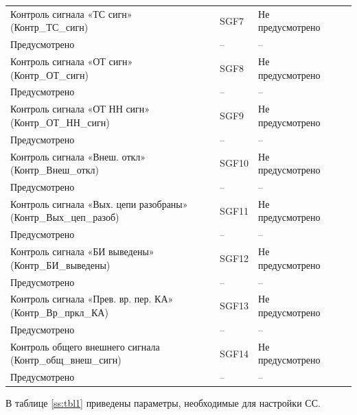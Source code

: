 \begin{longtable}{|>{\centering\arraybackslash}m{5.3cm}|>{\centering\arraybackslash}m{3.3cm}|>{\centering\arraybackslash}m{4.2cm}|>{\centering\arraybackslash}m{1.8cm}|>{\centering\arraybackslash}m{1cm}|}
\hline
\centering Контроль сигнала «ТС сигн» (Контр\_ТС\_сигн)  & \centering SGF7 & \centering Не предусмотрено \\ Предусмотрено & \centering -- & \centering \arraybackslash -- \\
\hline
\centering Контроль сигнала «ОТ сигн» (Контр\_ОТ\_сигн)  & \centering SGF8 & \centering Не предусмотрено \\ Предусмотрено & \centering -- & \centering \arraybackslash -- \\
\hline
\centering Контроль сигнала «ОТ НН сигн» (Контр\_ОТ\_НН\_сигн)  & \centering SGF9 & \centering Не предусмотрено \\ Предусмотрено & \centering -- & \centering \arraybackslash -- \\
\hline
\centering Контроль сигнала «Внеш. откл» (Контр\_Внеш\_откл)  & \centering SGF10 & \centering Не предусмотрено \\ Предусмотрено & \centering -- & \centering \arraybackslash -- \\
\hline
\centering Контроль сигнала «Вых. цепи разобраны» (Контр\_Вых\_цеп\_разоб)  & \centering SGF11 & \centering Не предусмотрено \\ Предусмотрено & \centering -- & \centering \arraybackslash -- \\
\hline
\centering Контроль сигнала «БИ выведены» (Контр\_БИ\_выведены)  & \centering SGF12 & \centering Не предусмотрено \\ Предусмотрено & \centering -- & \centering \arraybackslash -- \\
\hline
\centering Контроль сигнала «Прев. вр. пер. КА» (Контр\_Вр\_пркл\_КА)  & \centering SGF13 & \centering Не предусмотрено \\ Предусмотрено & \centering -- & \centering \arraybackslash -- \\
\hline
\centering Контроль общего внешнего сигнала (Контр\_общ\_внеш\_сигн)  & \centering SGF14 & \centering Не предусмотрено \\ Предусмотрено & \centering -- & \centering \arraybackslash -- \\
\hline
\end{longtable}
\normalsize


\par
В таблице \ref{ss:tbl1} приведены параметры, необходимые для настройки СС. 

